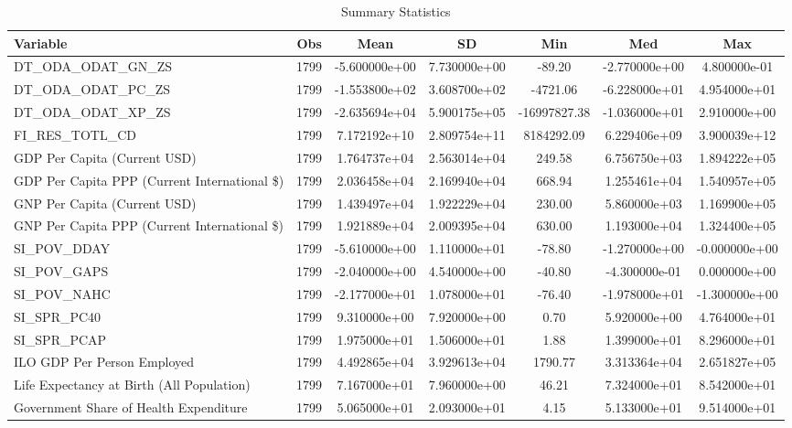 \begin{table}
\centering
\caption{Summary Statistics}
\label{Sum_Stats}
\begin{tabular}{lcccccc}
\toprule
                                    Variable &  Obs &          Mean &           SD &          Min &           Med &           Max \\
\midrule
DT\_ODA\_ODAT\_GN\_ZS & 1799 & -5.600000e+00 & 7.730000e+00 & -89.20 & -2.770000e+00 & 4.800000e-01 \\
DT\_ODA\_ODAT\_PC\_ZS & 1799 & -1.553800e+02 & 3.608700e+02 & -4721.06 & -6.228000e+01 & 4.954000e+01 \\
DT\_ODA\_ODAT\_XP\_ZS & 1799 & -2.635694e+04 & 5.900175e+05 & -16997827.38 & -1.036000e+01 & 2.910000e+00 \\
FI\_RES\_TOTL\_CD & 1799 & 7.172192e+10 & 2.809754e+11 & 8184292.09 & 6.229406e+09 & 3.900039e+12 \\
GDP Per Capita (Current USD) & 1799 & 1.764737e+04 & 2.563014e+04 & 249.58 & 6.756750e+03 & 1.894222e+05 \\
GDP Per Capita PPP (Current International \$) & 1799 & 2.036458e+04 & 2.169940e+04 & 668.94 & 1.255461e+04 & 1.540957e+05 \\
GNP Per Capita (Current USD) & 1799 & 1.439497e+04 & 1.922229e+04 & 230.00 & 5.860000e+03 & 1.169900e+05 \\
GNP Per Capita PPP (Current International \$) & 1799 & 1.921889e+04 & 2.009395e+04 & 630.00 & 1.193000e+04 & 1.324400e+05 \\
SI\_POV\_DDAY & 1799 & -5.610000e+00 & 1.110000e+01 & -78.80 & -1.270000e+00 & -0.000000e+00 \\
SI\_POV\_GAPS & 1799 & -2.040000e+00 & 4.540000e+00 & -40.80 & -4.300000e-01 & 0.000000e+00 \\
SI\_POV\_NAHC & 1799 & -2.177000e+01 & 1.078000e+01 & -76.40 & -1.978000e+01 & -1.300000e+00 \\
SI\_SPR\_PC40 & 1799 & 9.310000e+00 & 7.920000e+00 & 0.70 & 5.920000e+00 & 4.764000e+01 \\
SI\_SPR\_PCAP & 1799 & 1.975000e+01 & 1.506000e+01 & 1.88 & 1.399000e+01 & 8.296000e+01 \\
ILO GDP Per Person Employed & 1799 & 4.492865e+04 & 3.929613e+04 & 1790.77 & 3.313364e+04 & 2.651827e+05 \\
Life Expectancy at Birth (All Population) & 1799 & 7.167000e+01 & 7.960000e+00 & 46.21 & 7.324000e+01 & 8.542000e+01 \\
Government Share of Health Expenditure & 1799 & 5.065000e+01 & 2.093000e+01 & 4.15 & 5.133000e+01 & 9.514000e+01 \\
\bottomrule
\end{tabular}
\end{table}
